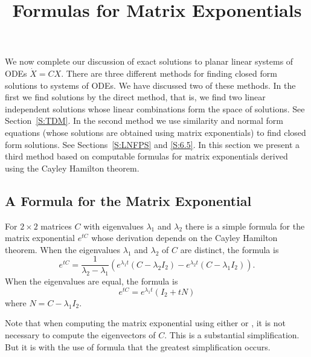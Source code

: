 \documentclass{ximera}
\title{Formulas for Matrix Exponentials}
\begin{document}
\begin{abstract}
\end{abstract}
\maketitle


\label{S:6.6}

We now complete our discussion of exact solutions to planar linear systems of
ODEs $\dot{X}=CX$.  There are three different methods for finding closed form
solutions to systems of ODEs.  We have discussed two of these methods.  In
the first we find solutions by the direct method, that is, we find two linear
independent solutions whose linear combinations form the space of solutions.
See Section~\ref{S:TDM}.  In the second method we use similarity and normal
form equations (whose solutions are obtained using matrix exponentials) to
find closed form solutions.  See Sections~\ref{S:LNFPS} and \ref{S:6.5}.
In this section we present a third method based on computable formulas for
matrix exponentials derived using the Cayley Hamilton theorem.

\subsection*{A Formula for the Matrix Exponential}

For $2\times 2$ matrices $C$ with eigenvalues $\lambda_1$ and $\lambda_2$
there is a simple formula for the matrix exponential $e^{tC}$ whose
derivation depends on the Cayley Hamilton theorem.   When the eigenvalues $\lambda_1$ and $\lambda_2$ of $C$ are
distinct, the formula is
\begin{equation}  \label{E:exdist}
e^{tC} = \frac{1}{\lambda_2-\lambda_1}\left(e^{\lambda_1 t}(C-\lambda_2I_2) -
e^{\lambda_2 t}(C-\lambda_1I_2)\right).
\end{equation}
When the eigenvalues are equal, the formula is
\begin{equation}  \label{E:exeq}
e^{tC} = e^{\lambda_1 t}(I_2 + tN)
\end{equation}
where $N = C - \lambda_1I_2$.

Note that when computing the matrix exponential using either 
or , it is not necessary to compute the eigenvectors of $C$.
This is a substantial simplification.  But it is with the use of formula
 that the greatest simplification occurs.
\end{document}
